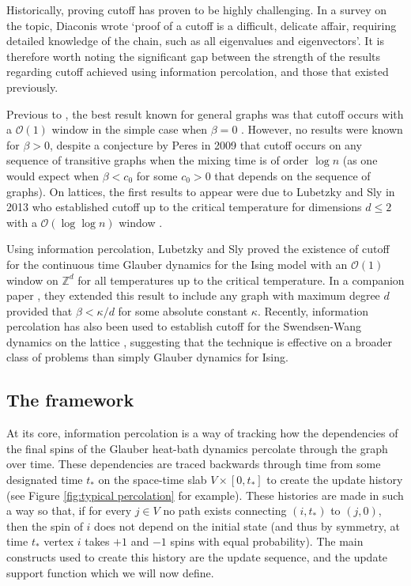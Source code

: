 	Historically, proving cutoff has proven to be highly challenging. In a survey on the topic, Diaconis \cite{Diaconis1996-sz} wrote `proof of a cutoff is a difficult, delicate affair, requiring detailed knowledge of the chain, such as all eigenvalues and eigenvectors'. It is therefore worth noting the significant gap between the strength of the results regarding cutoff achieved using information percolation, and those that existed previously.

	Previous to \cite{Lubetzky2016-wd}, the best result known for general graphs was that cutoff occurs with a $\mathcal{O}(1)$ window in the simple case when $\beta = 0$ \cite{Aldous1983-gz}. However, no results were known for $\beta > 0$, despite a conjecture by Peres in 2009 \cite[Section 23.2]{Levin2009-fo} that cutoff occurs on any sequence of transitive graphs when the mixing time is of order $\log n$ (as one would expect when $\beta < c_0$ for some $c_0 > 0$ that depends on the sequence of graphs). On lattices, the first results to appear were due to Lubetzky and Sly in 2013 who established cutoff up to the critical temperature for dimensions $d \leq 2$ with a $\mathcal{O}(\log \log n)$ window \cite{Lubetzky2013-yv}. 

	Using information percolation, Lubetzky and Sly proved the existence of cutoff for the continuous time Glauber dynamics for the Ising model with an $\mathcal{O}(1)$ window on $\mathbb{Z}^d$ for all temperatures up to the critical temperature. In a companion paper \cite{Lubetzky2017-nc}, they extended this result to include any graph with maximum degree $d$ provided that $\beta < \kappa/d$ for some absolute constant $\kappa$. Recently, information percolation has also been used to establish cutoff for the Swendsen-Wang dynamics on the lattice \cite{Nam2018-io}, suggesting that the technique is effective on a broader class of problems than simply Glauber dynamics for Ising.
	
	\subsection{The framework}
	At its core, information percolation is a way of tracking how the dependencies of the final spins of the Glauber heat-bath dynamics percolate through the graph over time. These dependencies are traced backwards through time from some designated time $t_*$ on the space-time slab $V \times [0, t_*]$ to create the update history (see Figure \ref{fig:typical percolation} for example). These histories are made in such a way so that, if for every $j \in V$ no path exists connecting $(i, t_*)$ to $(j, 0)$, then the spin of $i$ does not depend on the initial state (and thus by symmetry, at time $t_*$ vertex $i$ takes $+1$ and $-1$ spins with equal probability). The main constructs used to create this history are the update sequence, and the update support function which we will now define.

